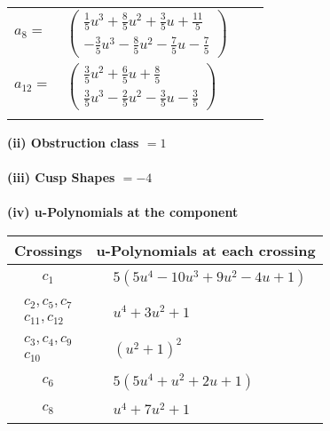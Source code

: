 \documentclass[1p]{elsarticle_modified}
\theoremstyle{definition}
\begin{document}
\begin{tabular}{m{7pt} m{180pt} m{7pt} m{180pt} }
\flushright $a_{8}=$&$\begin{pmatrix}\frac{1}{5} u^3+\frac{8}{5} u^2+\frac{3}{5} u+\frac{11}{5}\\-\frac{3}{5} u^3-\frac{8}{5} u^2-\frac{7}{5} u-\frac{7}{5}\end{pmatrix}$ \\
\flushright $a_{12}=$&$\begin{pmatrix}\frac{3}{5} u^2+\frac{6}{5} u+\frac{8}{5}\\\frac{3}{5} u^3-\frac{2}{5} u^2-\frac{3}{5} u-\frac{3}{5}\end{pmatrix}$\\&\end{tabular}
\flushleft \textbf{(ii) Obstruction class $= 1$}\\~\\
\flushleft \textbf{(iii) Cusp Shapes $= -4$}\\~\\
\newpage\renewcommand{\arraystretch}{1}
\flushleft \textbf{(iv) u-Polynomials at the component}\newline \\
\begin{tabular}{m{50pt}|m{274pt}}
Crossings & \hspace{64pt}u-Polynomials at each crossing \\
\hline $$\begin{aligned}c_{1}\end{aligned}$$&$\begin{aligned}
&5(5 u^4-10 u^3+9 u^2-4 u+1)
\end{aligned}$\\
\hline $$\begin{aligned}c_{2},c_{5},c_{7}\\c_{11},c_{12}\end{aligned}$$&$\begin{aligned}
&u^4+3 u^2+1
\end{aligned}$\\
\hline $$\begin{aligned}c_{3},c_{4},c_{9}\\c_{10}\end{aligned}$$&$\begin{aligned}
&(u^2+1)^2
\end{aligned}$\\
\hline $$\begin{aligned}c_{6}\end{aligned}$$&$\begin{aligned}
&5(5 u^4+u^2+2 u+1)
\end{aligned}$\\
\hline $$\begin{aligned}c_{8}\end{aligned}$$&$\begin{aligned}
&u^4+7 u^2+1
\end{aligned}$\\
\hline
\end{tabular}\\~\\
\end{document}
